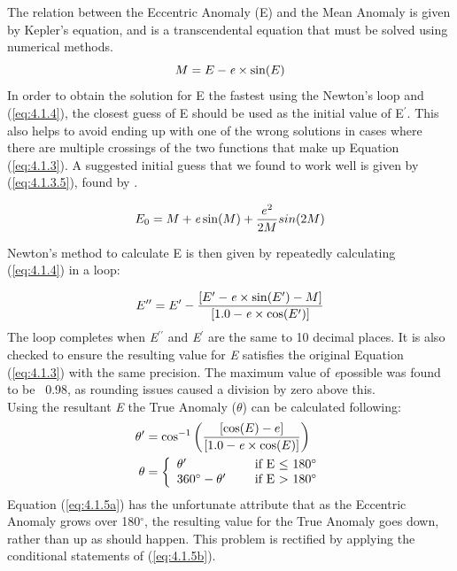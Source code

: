 \documentclass[12pt,preprint]{aastex}
\begin{document}
The relation between the Eccentric Anomaly (E) and the Mean Anomaly is given by Kepler's equation, and is a transcendental equation that must be solved using numerical methods.
\begin{equation}\label{eq:4.1.3}
M = E - {\it e}\times\sin(E)
\end{equation}
In order to obtain the solution for E the fastest using the Newton's loop and (\ref{eq:4.1.4}), the closest guess of E should be used as the initial value of E$^{\prime}$.  This also helps to avoid ending up with one of the wrong solutions in cases where there are multiple crossings of the two functions that make up Equation (\ref{eq:4.1.3}).  A suggested initial guess that we found to work well is given by (\ref{eq:4.1.3.5}), found by \citep{Argyle}.

\begin{equation}\label{eq:4.1.3.5}
E_0 = M+{\it e}\sin(M) + \frac{e^2}{2M}sin(2M)
\end{equation}

Newton's method to calculate E is then given by repeatedly calculating (\ref{eq:4.1.4}) in a loop:
  
\begin{equation}\label{eq:4.1.4}
E^{\prime \prime} = E^{\prime} - \frac{[E^{\prime} - {\it e} \times \sin(E^{\prime}) - M]}{[1.0 - {\it e} \times \cos(E^{\prime})]}
\end{equation}
The loop completes when {\it E$^{\prime \prime}$} and {\it E$^{\prime}$} are the same to 10 decimal places.  It is also checked to ensure the resulting value for {\it E} satisfies the original Equation (\ref{eq:4.1.3}) with the same precision.  The maximum value of {\it e}possible was found to be ~0.98, as rounding issues caused a division by zero above this.\\

Using the resultant {\it E} the True Anomaly ($\theta$) can be calculated following:
\begin{subequations}
\begin{align}
\label{eq:4.1.5a}
\theta^{\prime}& = \cos^{-1} \bigg( \frac{[\cos(E) - e]}{[1.0 -{\it e}\times \cos(E)]} \bigg)\\
\label{eq:4.1.5b}
\theta& = \left\{ \begin{array}{l l} \theta^{\prime}& \quad \text{ if E $\leq$ 180$^{\circ}$}\\ 360^{\circ}  - \theta^{\prime}& \quad \text{ if E $>$ 180$^{\circ}$} \end{array}\right.
\end{align}
\end{subequations}
Equation (\ref{eq:4.1.5a}) has the unfortunate attribute that as the Eccentric Anomaly grows over 180$^{\circ}$, the resulting value for the True Anomaly goes down, rather than up as should happen.  This problem is rectified by applying the conditional statements of (\ref{eq:4.1.5b}).\\  
\end{document}
